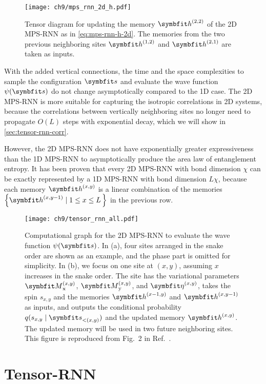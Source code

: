 \begin{figure}[htb]
\centering
\texttt{[image: ch9/mps\_rnn\_2d\_h.pdf]}
\caption[Tensor diagram for memory update of 2D MPS-RNN]{
Tensor diagram for updating the memory $\vh^{(2, 2)}$ of the 2D MPS-RNN as in \cref{eq:mps-rnn-h-2d}.
The memories from the two previous neighboring sites $\vh^{(1, 2)}$ and $\vh^{(2, 1)}$ are taken as inputs.
}
\label{fig:mps-rnn-h-2d}
\end{figure}

With the added vertical connections, the time and the space complexities to sample the configuration $\vs$ and evaluate the wave function $\psi(\vs)$ do not change asymptotically compared to the 1D case. The 2D MPS-RNN is more suitable for capturing the isotropic correlations in 2D systems, because the correlations between vertically neighboring sites no longer need to propagate $O(L)$ steps with exponential decay, which we will show in \cref{sec:tensor-rnn-corr}.

However, the 2D MPS-RNN does not have exponentially greater expressiveness than the 1D MPS-RNN to asymptotically produce the area law of entanglement entropy. It has been proven that every 2D MPS-RNN with bond dimension $\chi$ can be exactly represented by a 1D MPS-RNN with bond dimension $L \chi$, because each memory $\vh^{(x, y)}$ is a linear combination of the memories $\left\{ \vh^{(x, y - 1)} \mid 1 \le x \le L\,\right\}$ in the previous row.

\begin{figure}[htb]
\centering
\texttt{[image: ch9/tensor\_rnn\_all.pdf]}
\caption[Computational graph for 2D MPS-RNN]{
Computational graph for the 2D MPS-RNN to evaluate the wave function $\psi(\vs)$.
In (a), four sites arranged in the snake order are shown as an example, and the phase part is omitted for simplicity.
In (b), we focus on one site at $(x, y)$, assuming $x$ increases in the snake order.
The site has the variational parameters $\mM^{(x, y)}_\text{x}$, $\mM^{(x, y)}_\text{y}$, and $\vet^{(x, y)}$, takes the spin $s_{x, y}$ and the memories $\vh^{(x - 1, y)}$ and $\vh^{(x, y - 1)}$ as inputs, and outputs the conditional probability $q(s_{x, y} \mid \vs_{< (x, y)})$ and the updated memory $\vh^{(x, y)}$.
The updated memory will be used in two future neighboring sites.
This figure is reproduced from Fig.~2 in Ref.~\cite{wu2023tensor}.
}
\label{fig:tensor-rnn-all}
\end{figure}

\section{Tensor-RNN}
\label{sec:tensor-rnn}

